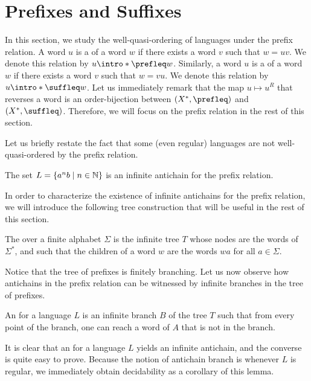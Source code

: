 \section{Prefixes and Suffixes}
\label{prefixes-suffixes:sec}

In this section, we study the well-quasi-ordering of languages under the prefix
relation. A word $u$ is a  of a word $w$ if there exists a word
$v$ such that $w = uv$. We denote this relation by $u \intro*\prefleq w$.
Similarly, a word $u$ is a  of a word $w$ if there exists a word
$v$ such that $w = vu$. We denote this relation by $u \intro*\suffleq w$. Let
us immediately remark that the map $u \mapsto u^R$ that reverses a word is an
order-bijection between $(X^*, \prefleq)$ and $(X^*, \suffleq)$. Therefore, we
will focus on the prefix relation in the rest of this section.


Let us briefly restate the fact that some (even regular) languages 
are not well-quasi-ordered by the prefix relation.

\begin{example}
    The set $L = \{ a^nb \mid n \in \mathbb{N} \}$ is an infinite antichain for the
    prefix relation.
\end{example}

In order to characterize the existence of infinite antichains for the prefix
relation, we will introduce the following tree construction that
will be useful in the rest of this section.

\begin{definition}
    The  over a finite alphabet $\Sigma$
    is the infinite tree $T$ whose nodes are the words of $\Sigma^*$, and
    such that the children of a word $w$ are the words $wa$ for all $a \in
    \Sigma$. 
\end{definition}

Notice that the tree of prefixes is finitely branching. Let us now
observe how antichains in the prefix relation can be witnessed
by infinite branches in the tree of prefixes.

\begin{definition}
    An  for a language $L$ is an infinite 
    branch $B$ of the tree $T$ such that from every point of the branch, 
    one can reach a word of $A$ that is not in the branch.
\end{definition}

It is clear that an  for a language $L$ yields an infinite
antichain, and the converse is quite easy to prove. Because the notion of
antichain branch is  whenever $L$ is regular, we
immediately obtain decidability as a corollary of this lemma.

